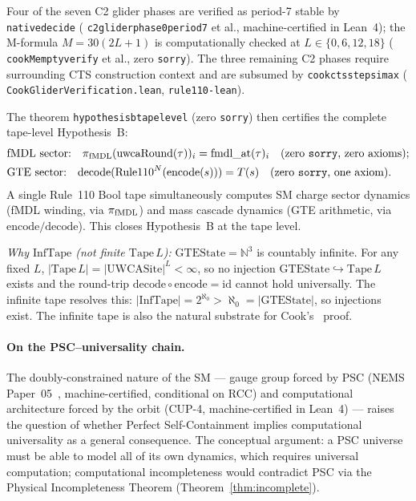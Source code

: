 \documentclass[11pt]{article}
\theoremstyle{remark}
\newcommand{\lean}[1]{%
  \penalty-100
  \begingroup\def\_{\textunderscore\allowbreak}\texttt{#1}\endgroup}
\begin{document}
Four of the seven C2 glider phases are verified as period-7 stable by
\lean{native\_decide} (\lean{c2\_glider\_phase0\_period7} et al., machine-certified in Lean~4); the M-formula
$M = 30(2L+1)$ is computationally checked at $L \in \{0, 6, 12, 18\}$
(\lean{cook\_M\_empty\_verify} et al., zero \texttt{sorry}).
The three remaining C2 phases require surrounding CTS construction context and are
subsumed by \lean{cook\_cts\_step\_sim\_ax} (\lean{CookGliderVerification.lean},
\texttt{rule110-lean}).

The theorem \lean{hypothesis\_b\_tape\_level} (zero \texttt{sorry}) then
certifies the complete tape-level Hypothesis~B:
\begin{align}
  &\text{fMDL sector:}\quad\pi_{\mathrm{fMDL}}(\mathrm{uwcaRound}(\tau))_i
    = \mathrm{fmdl\_at}(\tau)_i
    \quad\text{(zero \texttt{sorry}, zero axioms);}\\
  &\text{GTE sector:}\quad
    \mathrm{decode}(\mathrm{Rule110}^N(\mathrm{encode}(s))) = T(s)
    \quad\text{(zero \texttt{sorry}, one axiom).}
\end{align}
A single Rule~110 Bool tape simultaneously computes SM charge sector dynamics
(fMDL winding, via $\pi_{\rm fMDL}$) and mass cascade dynamics (GTE arithmetic,
via $\mathrm{encode}/\mathrm{decode}$). This closes Hypothesis~B at the tape level.

\textit{Why $\mathrm{InfTape}$ (not finite $\mathrm{Tape}\,L$):} $\mathrm{GTEState} = \mathbb{N}^3$
is countably infinite. For any fixed $L$, $|\mathrm{Tape}\,L| = |\mathrm{UWCASite}|^L < \infty$,
so no injection $\mathrm{GTEState} \hookrightarrow \mathrm{Tape}\,L$ exists and the
round-trip $\mathrm{decode} \circ \mathrm{encode} = \mathrm{id}$ cannot hold universally.
The infinite tape resolves this: $|\mathrm{InfTape}| = 2^{\aleph_0} > \aleph_0 = |\mathrm{GTEState}|$,
so injections exist. The infinite tape is also the natural substrate for Cook's~\cite{Cook2004,Cook2009}
proof.

\paragraph{On the PSC--universality chain.}
The doubly-constrained nature of the SM --- gauge group forced by PSC (NEMS Paper~05~\cite{SpivackUGP2024},
machine-certified, conditional on RCC) and computational architecture forced by the orbit (CUP-4,
machine-certified in Lean~4) --- raises the question of whether Perfect Self-Containment implies
computational universality as a general consequence. The conceptual argument: a PSC universe
must be able to model all of its own dynamics, which requires universal computation;
computational incompleteness would contradict PSC via the Physical Incompleteness Theorem
(Theorem~\ref{thm:incomplete}).
\end{document}
